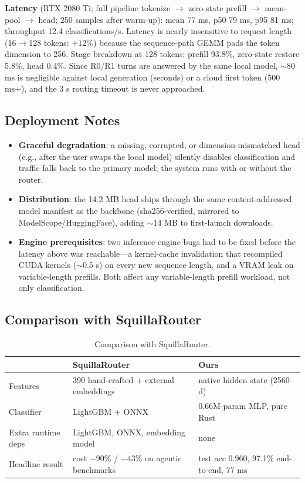 \documentclass[11pt]{article}
\begin{document}
\textbf{Latency} (RTX 2080 Ti; full pipeline tokenize $\to$ zero-state
prefill $\to$ mean-pool $\to$ head; 250 samples after warm-up): mean 77 ms,
p50 79 ms, p95 81 ms; throughput 12.4 classifications/s. Latency is nearly
insensitive to request length (16$\to$128 tokens: $+12\%$) because the
sequence-path GEMM pads the token dimension to 256. Stage breakdown at 128
tokens: prefill 93.8\%, zero-state restore 5.8\%, head 0.4\%. Since R0/R1
turns are answered by the same local model, $\sim$80 ms is negligible
against local generation (seconds) or a cloud first token (500 ms+), and the
3 s routing timeout is never approached.

\subsection{Deployment Notes}

\begin{itemize}
  \item \textbf{Graceful degradation}: a missing, corrupted, or
  dimension-mismatched head (e.g., after the user swaps the local model)
  silently disables classification and traffic falls back to the primary
  model; the system runs with or without the router.
  \item \textbf{Distribution}: the 14.2 MB head ships through the same
  content-addressed model manifest as the backbone (sha256-verified,
  mirrored to ModelScope/HuggingFace), adding $\sim$14 MB to first-launch
  downloads.
  \item \textbf{Engine prerequisites}: two inference-engine bugs had to be
  fixed before the latency above was reachable---a kernel-cache invalidation
  that recompiled CUDA kernels ($\sim$0.5 s) on every new sequence length,
  and a VRAM leak on variable-length prefills. Both affect any
  variable-length prefill workload, not only classification.
\end{itemize}

\subsection{Comparison with SquillaRouter}

\begin{table}[h]
\centering
\small
\begin{tabular}{lll}
\toprule
 & SquillaRouter \cite{squillarouter} & Ours \\
\midrule
Features & 390 hand-crafted + external embeddings & native hidden state (2560-d) \\
Classifier & LightGBM + ONNX & 0.66M-param MLP, pure Rust \\
Extra runtime deps & LightGBM, ONNX, embedding model & none \\
Headline result & cost $-90\%$ / $-43\%$ on agentic benchmarks & test acc 0.960,
97.1\% end-to-end, 77 ms \\
\bottomrule
\end{tabular}
\caption{Comparison with SquillaRouter.}
\end{table}
\end{document}

